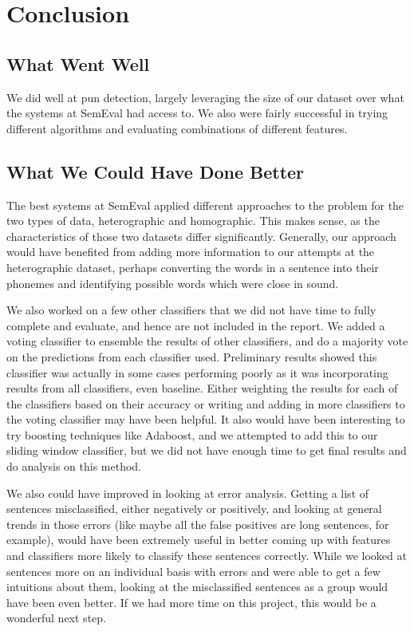\documentclass{article}
\begin{document}
\section{Conclusion}
\label{conclusion}

\subsection{What Went Well}

We did well at pun detection, largely leveraging the size of our dataset over
what the systems at SemEval had access to. We also were fairly successful in
trying different algorithms and evaluating combinations of different features. 

\subsection{What We Could Have Done Better}

The best systems at SemEval applied different approaches to the problem for the
two types of data, heterographic and homographic. This makes sense, as the
characteristics of those two datasets differ significantly. Generally, our
approach would have benefited from adding more information to our attempts at
the heterographic dataset, perhaps converting the words in a sentence into their
phonemes and identifying possible words which were close in sound.

We also worked on a few other classifiers that we did not have time to fully complete and evaluate, and hence are not included in the report. We added a voting classifier to ensemble the results of other classifiers, and do a majority vote on the predictions from each classifier used. Preliminary results showed this classifier was actually in some cases performing poorly as it was incorporating results from all classifiers, even baseline. Either weighting the results for each of the classifiers based on their accuracy or writing and adding in more classifiers to the voting classifier may have been helpful. It also would have been interesting to try boosting techniques like Adaboost, and we attempted to add this to our sliding window classifier, but we did not have enough time to get final results and do analysis on this method.

We also could have improved in looking at error analysis. Getting a list of sentences misclassified, either negatively or positively, and looking at general trends in those errors (like maybe all the false positives are long sentences, for example), would have been extremely useful in better coming up with features and classifiers more likely to classify these sentences correctly. While we looked at sentences more on an individual basis with errors and were able to get a few intuitions about them, looking at the misclassified sentences as a group would have been even better. If we had more time on this project, this would be a wonderful next step.
\end{document}
